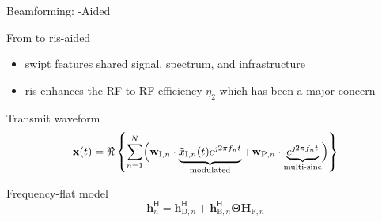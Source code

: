 \documentclass[presentation,xcolor={table},9pt]{beamer}
\begin{document}
\begin{section}{Beamforming: -Aided }
\begin{frame}{From  to \gls{ris}-aided }
		\begin{itemize}
			\item \gls{swipt} features shared signal, spectrum, and infrastructure
			\item \gls{ris} enhances the RF-to-RF efficiency $\eta_2$ which has been a major concern
		\end{itemize}
		\begin{block}{Transmit waveform}
			\begin{equation*}
				\mathbf{x}(t) = \Re \left\{\sum_{n=1}^N \Bigl(\mathbf{w}_{\mathrm{I},n} \cdot \underbrace{\tilde{x}_{\mathrm{I},n}(t) e^{\jmath 2{\pi}{f_n}{t}}}_\text{modulated}+\mathbf{w}_{\mathrm{P},n} \cdot \underbrace{e^{\jmath 2{\pi}{f_n}{t}}}_\text{multi-sine}\Bigr) \right\}
			\end{equation*}
		\end{block}
		\begin{block}{Frequency-flat  model}
			\begin{equation*}
				\mathbf{h}_{n}^\mathsf{H} = \mathbf{h}_{\mathrm{D},n}^\mathsf{H} + \mathbf{h}_{\mathrm{B},n}^\mathsf{H} \mathbf{\Theta} \mathbf{H}_{\mathrm{F},n}
			\end{equation*}
		\end{block}
	\end{frame}


\end{section}
\end{document}
